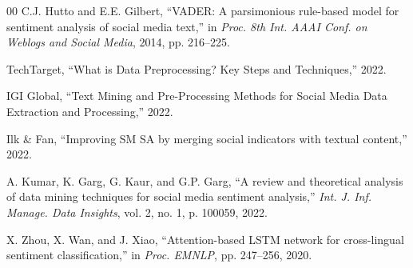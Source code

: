 \documentclass[conference]{IEEEtran}
\begin{document}
\begin{thebibliography}{00}
C.J. Hutto and E.E. Gilbert, 
``VADER: A parsimonious rule-based model for sentiment analysis of social media text,'' 
in \textit{Proc. 8th Int. AAAI Conf. on Weblogs and Social Media}, 2014, pp. 216--225.

TechTarget, 
``What is Data Preprocessing? Key Steps and Techniques,'' 
2022.

IGI Global, 
``Text Mining and Pre-Processing Methods for Social Media Data Extraction and Processing,'' 
2022.

Ilk \& Fan, 
``Improving SM SA by merging social indicators with textual content,'' 
2022.

A. Kumar, K. Garg, G. Kaur, and G.P. Garg, 
``A review and theoretical analysis of data mining techniques for social media sentiment analysis,'' 
\textit{Int. J. Inf. Manage. Data Insights}, vol. 2, no. 1, p. 100059, 2022.

X. Zhou, X. Wan, and J. Xiao, 
``Attention-based LSTM network for cross-lingual sentiment classification,'' 
in \textit{Proc. EMNLP}, pp. 247--256, 2020.


\end{thebibliography}
\end{document}
